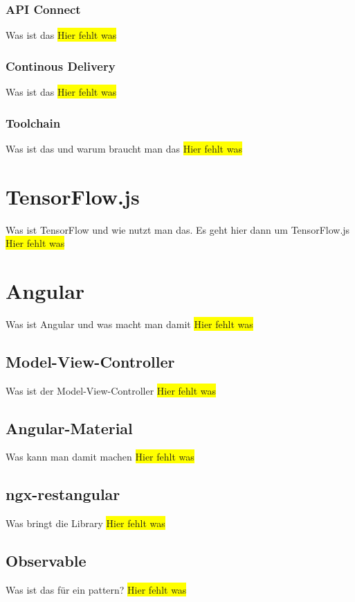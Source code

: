 \subsubsection{API Connect}
Was ist das
\colorbox{yellow}{Hier fehlt was}

\subsubsection{Continous Delivery}
Was ist das
\colorbox{yellow}{Hier fehlt was}

\subsubsection{Toolchain}
Was ist das und warum braucht man das
\colorbox{yellow}{Hier fehlt was}

\section{TensorFlow.js}
Was ist TensorFlow und wie nutzt man das. Es geht hier dann um TensorFlow.js
\colorbox{yellow}{Hier fehlt was}

\section{Angular}
Was ist Angular und was macht man damit
\colorbox{yellow}{Hier fehlt was}

\subsection{Model-View-Controller}
Was ist der Model-View-Controller
\colorbox{yellow}{Hier fehlt was}

\subsection{Angular-Material}
Was kann man damit machen
\colorbox{yellow}{Hier fehlt was}

\subsection{ngx-restangular}
Was bringt die Library
\colorbox{yellow}{Hier fehlt was}

\subsection{Observable}
Was ist das für ein pattern?
\colorbox{yellow}{Hier fehlt was}

